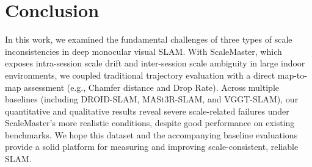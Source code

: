 
% 


% 
\section{Conclusion}
\label{sec:conclusion}

In this work, we examined the fundamental challenges of three types of scale inconsistencies in deep monocular visual \ac{SLAM}. With ScaleMaster, which exposes intra-session scale drift and inter-session scale ambiguity in large indoor environments, we coupled traditional trajectory evaluation with a direct map-to-map assessment (e.g., Chamfer distance and Drop Rate). Across multiple baselines (including DROID-SLAM, MASt3R-SLAM, and VGGT-SLAM), our quantitative and qualitative results reveal severe scale-related failures under ScaleMaster's more realistic conditions, despite good performance on existing benchmarks. We hope this dataset and the accompanying baseline evaluations provide a solid platform for measuring and improving scale-consistent, reliable SLAM.
